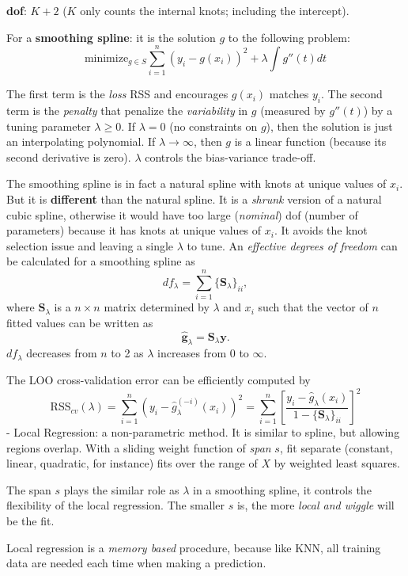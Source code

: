 \documentclass[
  letterpaper,
  DIV=11,
  numbers=noendperiod]{scrreprt}
\begin{document}
\textbf{dof}: \(K+2\) (\(K\) only counts the internal knots; including
the intercept).

For a \textbf{smoothing spline}: it is the solution \(g\) to the
following problem: \[
  \text{minimize}_{g\in S}\sum_{i=1}^n(y_i-g(x_i))^2 +\lambda \int g''(t)dt
  \]

The first term is the \emph{loss} RSS and encourages \(g(x_i)\) matches
\(y_i\). The second term is the \emph{penalty} that penalize the
\emph{variability} in \(g\) (measured by \(g''(t)\)) by a tuning
parameter \(\lambda \ge 0\). If \(\lambda=0\) (no constraints on \(g\)),
then the solution is just an interpolating polynomial. If
\(\lambda\to \infty\), then \(g\) is a linear function (because its
second derivative is zero). \(\lambda\) controls the bias-variance
trade-off.

The smoothing spline is in fact a natural spline with knots at unique
values of \(x_i\). But it is \textbf{different} than the natural spline.
It is a \emph{shrunk} version of a natural cubic spline, otherwise it
would have too large (\emph{nominal}) dof (number of parameters) because
it has knots at unique values of \(x_i\). It avoids the knot selection
issue and leaving a single \(\lambda\) to tune. An \emph{effective
degrees of freedom} can be calculated for a smoothing spline as \[
df_\lambda =\sum_{i=1}^n {\{\mathbf{S}_\lambda}\}_{ii}, 
\] where \(\mathbf{S}_\lambda\) is a \(n\times n\) matrix determined by
\(\lambda\) and \(x_i\) such that the vector of \(n\) fitted values can
be written as \[
\hat{\mathbf{g}}_\lambda =\mathbf{S}_\lambda \mathbf{y}.
\] \(df_\lambda\) decreases from \(n\) to 2 as \(\lambda\) increases
from 0 to \(\infty\).

The LOO cross-validation error can be efficiently computed by \[
\text{RSS}_{cv}(\lambda) =\sum_{i=1}^n (y_i-\hat{g}_\lambda ^{(-i)}(x_i))^2=\sum_{i=1}^n \left[ \frac{y_i-\hat{g}_\lambda (x_i)}{1-\{ {\mathbf S}_\lambda\}_{ii}} \right]^2
\] - Local Regression: a non-parametric method. It is similar to spline,
but allowing regions overlap. With a sliding weight function of
\emph{span} \(s\), fit separate (constant, linear, quadratic, for
instance) fits over the range of \(X\) by weighted least squares.

The span \(s\) plays the similar role as \(\lambda\) in a smoothing
spline, it controls the flexibility of the local regression. The smaller
\(s\) is, the more \emph{local and wiggle} will be the fit.

Local regression is a \emph{memory based} procedure, because like KNN,
all training data are needed each time when making a prediction.
\end{document}

